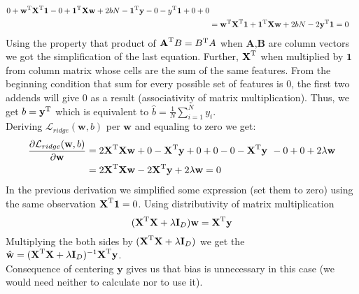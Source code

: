 \documentclass[10pt,a4paper]{article}
\begin{document}
\begin{enumerate}
\begin{align*}
0 + \textbf{w} ^ \text{T}\textbf{X} ^ \text{T}\textbf{1} - 0 + \textbf{1} ^ \text{T}\textbf{X}\textbf{w} + 2bN - \textbf{1} ^ \text{T}\textbf{y} - 0  - y ^ \text{T}\textbf{1} + 0 + 0\\
&= \textbf{w} ^ \text{T}\textbf{X} ^ \text{T}\textbf{1}  + \textbf{1} ^ \text{T}\textbf{X}\textbf{w}+ 2bN - 2\textbf{y} ^ \text{T}\textbf{1} = 0
\end{align*}
Using the property that product of $\textbf{A} ^ \text{T}B=B ^ \text{T}A$ when $\textbf{A,B}$ are column vectors we got the simplification of the last equation.
Further, $\textbf{X} ^ \text{T}$ when multiplied by $\textbf{1}$ from column matrix whose cells are the sum of the same features. From the beginning condition that sum for every possible set of features is 0, the first two addends will give 0 as a result (associativity of matrix multiplication). Thus, we get $b = \textbf{y} ^ \text{T}$ which is equivalent to $\hat{b}=\frac{1}{N}\sum_{i=1}^Ny_i$.
\\
Deriving $\mathcal{L}_{ridge}(\textbf{w},b) $ per $\textbf{w}$ and equaling to zero we get:
\begin{align*}
\frac{\partial\mathcal{L}_{ridge}(\textbf{w},b)}{\partial \textbf{w}} &= 
2\textbf{X} ^ \text{T}\textbf{X}\textbf{w} + 0 -  \textbf{X} ^ \text{T}\textbf{y} + 0 + 0 - 0 - \textbf{X} ^ \text{T}\textbf{y }- 0 + 0 +2\lambda\textbf{w}\\
&= 2\textbf{X} ^ \text{T}\textbf{X}\textbf{w} -2 \textbf{X} ^ \text{T}\textbf{y}  + 2\lambda\textbf{w} = 0
\end{align*}
In the previous derivation we simplified some expression (set them to zero) using the same observation $\textbf{X} ^ \text{T}\textbf{1}=0$. Using distributivity of matrix multiplication $$ (\textbf{X} ^ \text{T}\textbf{X} + \lambda \textbf{I}_D)\textbf{w} = \textbf{X} ^ \text{T}\textbf{y} $$ 
Multiplying the both sides by $(\textbf{X} ^ \text{T}\textbf{X} + \lambda \textbf{I}_D)$ we get the $\hat{\textbf{w}}=(\textbf{X} ^ \text{T}\textbf{X} + \lambda \textbf{I}_D)^{-1}\textbf{X} ^ \text{T}\textbf{y}$.
\\
Consequence of centering $\textbf{y}$ gives us that bias is unnecessary in this case (we would need neither to calculate nor to use it).
\end{enumerate}
\end{document}
